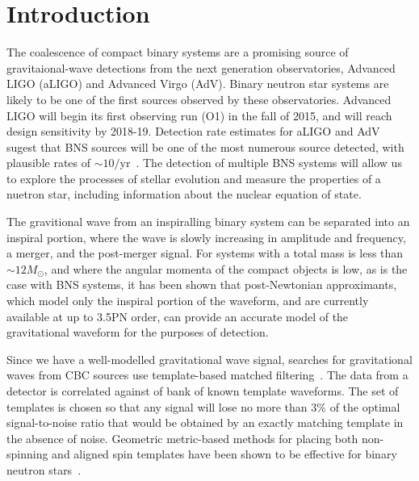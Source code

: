 \section{Introduction}

The coalescence of compact binary systems are a promising source of gravitaional-wave detections from the next generation observatories, Advanced LIGO (aLIGO) and Advanced Virgo (AdV). Binary neutron star systems are likely to be one of the first sources observed by these observatories. Advanced LIGO will begin its first observing run (O1) in the fall of 2015, and will reach design sensitivity by 2018-19. Detection rate estimates for aLIGO and AdV sugest that BNS sources will be one of the most numerous source detected, with plausible
rates of $\sim 10/\mathrm{yr}$~\cite{Abadie:2010cf}. The detection of multiple BNS systems will allow us to explore the processes of stellar evolution and measure the properties of a nuetron star, including information about the nuclear equation of state\cite{lacky}.


The gravitional wave from an inspiralling binary system can be separated into an inspiral portion, where the wave is slowly increasing in amplitude and frequency, a merger, and the post-merger signal. For systems with a total mass is less than $\sim 12 M_\odot$, and where the angular momenta of the compact objects is low, as is the case with BNS systems, it has been shown that post-Newtonian approximants, which model only the inspiral portion of the waveform, and are currently available at up to 3.5PN order, can provide an accurate model of the gravitational waveform for the purposes of detection.

Since we have a well-modelled gravitational wave signal, searches for gravitational waves from CBC sources use template-based matched filtering~\cite{Allen:2004gu}. The data from a detector is correlated against of bank of known template waveforms. The set of templates is chosen so that any signal will lose no more than $3\%$ of the optimal signal-to-noise ratio that would be obtained by an exactly matching template in the absence of noise. Geometric metric-based methods for placing both non-spinning and aligned spin templates have been shown to be effective for binary neutron stars~\cite{brown:2012qf}.

